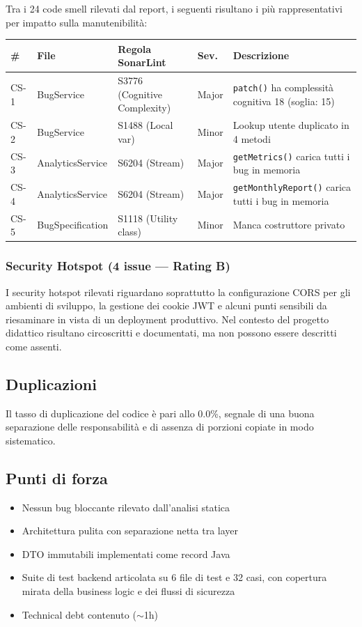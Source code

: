 ﻿\documentclass[a4paper,11pt]{article}
\begin{document}
Tra i 24 code smell rilevati dal report, i seguenti risultano i pi\`u rappresentativi per impatto sulla manutenibilit\`a:

\begin{tabular}{|l|l|p{2.5cm}|l|p{4cm}|}
\hline
\textbf{\#} & \textbf{File} & \textbf{Regola SonarLint} & \textbf{Sev.} & \textbf{Descrizione} \\
\hline
CS-1 & BugService & S3776 (Cognitive Complexity) & Major & \texttt{patch()} ha complessit\`a cognitiva 18 (soglia: 15) \\
\hline
CS-2 & BugService & S1488 (Local var) & Minor & Lookup utente duplicato in 4 metodi \\
\hline
CS-3 & AnalyticsService & S6204 (Stream) & Major & \texttt{getMetrics()} carica tutti i bug in memoria \\
\hline
CS-4 & AnalyticsService & S6204 (Stream) & Major & \texttt{getMonthlyReport()} carica tutti i bug in memoria \\
\hline
CS-5 & BugSpecification & S1118 (Utility class) & Minor & Manca costruttore privato \\
\hline
\end{tabular}

\subsubsection{Security Hotspot (4 issue --- Rating B)}

I security hotspot rilevati riguardano soprattutto la configurazione CORS per gli ambienti di sviluppo, la gestione dei cookie JWT e alcuni punti sensibili da riesaminare in vista di un deployment produttivo. Nel contesto del progetto didattico risultano circoscritti e documentati, ma non possono essere descritti come assenti.

\subsection{Duplicazioni}
Il tasso di duplicazione del codice \`e pari allo 0.0\%, segnale di una buona separazione delle responsabilit\`a e di assenza di porzioni copiate in modo sistematico.

\subsection{Punti di forza}
\begin{itemize}
  \item Nessun bug bloccante rilevato dall'analisi statica
  \item Architettura pulita con separazione netta tra layer
  \item DTO immutabili implementati come record Java
  \item Suite di test backend articolata su 6 file di test e 32 casi, con copertura mirata della business logic e dei flussi di sicurezza
  \item Technical debt contenuto ($\sim$1h)
\end{itemize}
\end{document}
